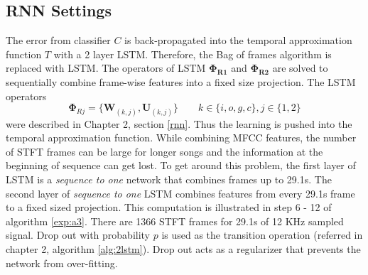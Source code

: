 \subsection{RNN Settings}
\label{rnn_s}
The error from classifier $C$ is back-propagated into the temporal approximation function $T$ with a 2 layer LSTM. Therefore, the Bag of frames algorithm is replaced with LSTM. The operators of LSTM $\bm{\Phi_{R1}}$ and $\bm{\Phi_{R2}}$ are solved to sequentially combine frame-wise features into a fixed size projection. The LSTM operators
\[
\bm{\Phi}_{Rj} = \{\textbf{W}_{(k,j)}, \textbf{U}_{(k,j)}\} \qquad k \in \{i,o,g,c\}, j \in \{1,2\}
\] 
were described in Chapter 2, section \ref{rnn}. Thus the learning is pushed into the temporal approximation function. While combining MFCC features, the number of STFT frames can be large for longer songs and the information at the beginning of sequence can get lost. To get around this problem, the first layer of LSTM is a \textit{sequence to one} network that combines frames up to 29.1s. The second layer of \textit{sequence to one} LSTM combines features from every 29.1s frame to a fixed sized projection. This computation is illustrated in step 6 - 12 of algorithm \ref{exp:a3}. There are 1366 STFT frames for 29.1s of 12 KHz sampled signal. Drop out with probability $p$ is used as the transition operation (referred in chapter 2, algorithm \ref{alg:2lstm}). Drop out acts as a regularizer that prevents the network from over-fitting.
